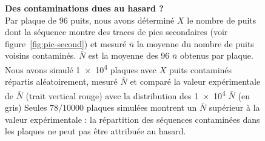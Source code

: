 \begin{center}
\begin{figure}[h!]


    \caption[Des contaminations dues au hasard ?]{%
      \label{fig:simul-count}\textbf{Des contaminations dues au hasard ? } \\
      \rmfamily \scriptsize Par plaque de 96 puits, nous avons déterminé \(X\)
      le nombre de puits dont la séquence montre des traces de pics secondaires
      (voir figure~\ref{fig:pic-second}) et mesuré \(\bar{n}\) la moyenne du
      nombre de puits voisins contaminés. \(\bar{N}\) est la moyenne des 96
      \(\bar{n}\) obtenus par plaque. Nous avons simulé \num{1e4} plaques avec
      \(X\) puits contaminés répartis aléatoirement, mesuré \(\bar{N}\) et
      comparé la valeur expérimentale de \(\bar{N}\) (trait vertical rouge) avec
      la distribution des \num{1e4} \(\bar{N}\) (en gris) Seules \(78 / 10000\)
      plaques simulées montrent un \(\bar{N}\) supérieur à la valeur
      expérimentale : la répartition des séquences contaminées dans les plaques
      ne peut pas être attribuée au hasard.
    }
  \end{figure}

\end{center}